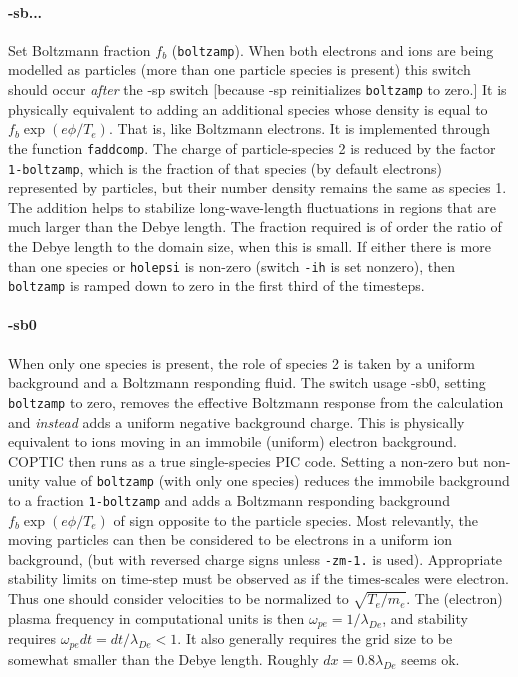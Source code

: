 \documentclass[12pt]{article}
\begin{document}
\paragraph{-sb...} Set Boltzmann fraction $f_b$
(\verb!boltzamp!). When both electrons and ions are being modelled as
particles (more than one particle species is present) this switch
should occur \emph{after} the -sp switch [because -sp reinitializes
\verb!boltzamp! to zero.] It is physically equivalent
to adding an additional species whose density is equal to
$f_b\exp(e\phi/T_e)$. That is, like Boltzmann electrons.  It is
implemented through the function \verb!faddcomp!. The charge of
particle-species 2 is reduced by the factor \verb!1-boltzamp!, which
is the fraction of that species (by default electrons) represented by
particles, but their number density remains the same as species 1.  The
addition helps to stabilize long-wave-length fluctuations in regions
that are much larger than the Debye length. The fraction required is
of order the ratio of the Debye length to the domain size, when this
is small. If either there is more than one species or \verb!holepsi!
is non-zero (switch \verb!-ih! is set nonzero), then \verb!boltzamp!
is ramped down to zero in the first third of the timesteps.

\paragraph{-sb0} When only one species is present, the role of species
2 is taken by a uniform background and a Boltzmann responding
fluid. The switch usage -sb0, setting \verb!boltzamp! to zero, removes
the effective Boltzmann response from the calculation and
\emph{instead} adds a uniform negative background charge.  This is
physically equivalent to ions moving in an immobile (uniform) electron
background.  COPTIC then runs as a true single-species PIC
code. Setting a non-zero but non-unity value of \verb!boltzamp! (with
only one species) reduces the immobile background to a fraction
\verb!1-boltzamp! and adds a Boltzmann responding background
$f_b\exp(e\phi/T_e)$ of sign opposite to the particle species. Most
relevantly, the moving particles can then be considered to be
electrons in a uniform ion background, (but with reversed charge signs
unless \verb!-zm-1.! is used). Appropriate stability limits on
time-step must be observed as if the times-scales were electron. Thus
one should consider velocities to be normalized to
$\sqrt{T_e/m_e}$. The (electron) plasma frequency in computational
units is then $\omega_{pe}=1/\lambda_{De}$, and stability requires
$\omega_{pe}dt = dt/\lambda_{De}<1$. It also generally requires the
grid size to be somewhat smaller than the Debye length. Roughly 
$dx=0.8\lambda_{De}$ seems ok.
\end{document}
